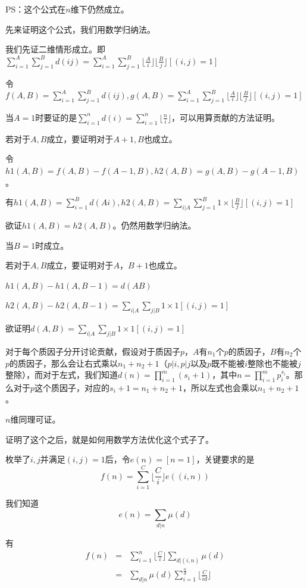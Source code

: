 \documentclass{ctexart}
\begin{document}
PS：这个公式在$n$维下仍然成立。

先来证明这个公式，我们用数学归纳法。

我们先证二维情形成立。即$\sum\limits_{i=1}^A \sum\limits_{j=1}^B d(ij)=\sum\limits_{i=1}^A \sum\limits_{j=1}^B \lfloor \frac{A}{i} \rfloor \lfloor \frac{B}{j} \rfloor [(i,j)=1]$

令$f(A,B)=\sum\limits_{i=1}^A \sum\limits_{j=1}^B d(ij),g(A,B)=\sum\limits_{i=1}^A \sum\limits_{j=1}^B \lfloor \frac{A}{i} \rfloor \lfloor \frac{B}{j} \rfloor [(i,j)=1]$

当$A=1$时要证的是$\sum_{i=1}^n d(i)=\sum_{i=1}^n \lfloor \frac{n}{i} \rfloor$，可以用算贡献的方法证明。

若对于$A,B$成立，要证明对于$A+1,B$也成立。

令$h1(A,B)=f(A,B)-f(A-1,B),h2(A,B)=g(A,B)-g(A-1,B)$。

有$h1(A,B)=\sum\limits_{i=1}^B d(Ai),h2(A,B)=\sum\limits_{i|A} \sum\limits_{j=1}^B 1 \times \lfloor \frac{B}{j} \rfloor [(i,j)=1]$

欲证$h1(A,B)=h2(A,B)$。仍然用数学归纳法。

当$B=1$时成立。

若对于$A,B$成立，要证明对于$A，B+1$也成立。

$h1(A,B)-h1(A,B-1)=d(AB)$

$h2(A,B)-h2(A,B-1)=\sum\limits_{i|A}\sum\limits_{j|B} 1 \times 1 [(i,j)=1]$

欲证明$d(A,B)=\sum\limits_{i|A}\sum\limits_{j|B} 1 \times 1 [(i,j)=1]$

对于每个质因子分开讨论贡献，假设对于质因子$p$，$A$有$n_1$个$p$的质因子，$B$有$n_2$个$p$的质因子，那么会让右式乘以$n_1+n_2+1$（$p|i,p|j$以及$p$既不能被$i$整除也不能被$j$整除），而对于左式，我们知道$d(n)=\prod\limits_{i=1}^m (s_i+1)$，其中$n=\prod_{i=1}^m p_i^{s_i}$。那么对于$p$这个质因子，对应的$s_i+1=n_1+n_2+1$，所以左式也会乘以$n_1+n_2+1$。

$n$维同理可证。

证明了这个之后，就是如何用数学方法优化这个式子了。

枚举了$i,j$并满足$(i,j)=1$后，令$e(n)=[n=1]$，关键要求的是\[f(n)=\sum_{i=1}^C \lfloor \frac{C}{i} \rfloor e((i,n))\]

我们知道\[e(n)=\sum_{d|n} \mu(d)\]

有
\begin{eqnarray*}
f(n) &= &\sum_{i=1}^n \lfloor \frac{C}{i} \rfloor \sum_{d|(i,n)} \mu(d)\\
& = & \sum_{d|n} \mu(d) \sum_{i=1}^{\frac{n}{d}} \lfloor \frac{C}{id} \rfloor
\end{eqnarray*}
\end{document}
